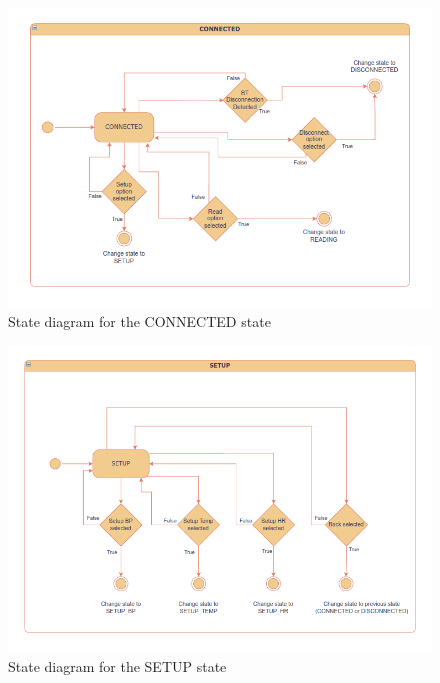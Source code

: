 \begin{figure}[H]
	\centering
	\includegraphics[width=\textwidth]{diagrams/states_connected}
	\caption{State diagram for the CONNECTED state}
	\label{fig:states_connected}
\end{figure}

\begin{figure}[H]
	\centering
	\includegraphics[width=\textwidth]{diagrams/states_setup}
	\caption{State diagram for the SETUP state}
	\label{fig:states_setup}
\end{figure}

